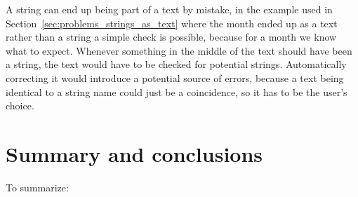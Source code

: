 A {\bibtex} string can end up being part of a text by mistake, in the
example used in Section~\ref{sec:problems_strings_as_text} where the
month ended up as a text rather than a string a simple check is
possible, because for a month we know what to expect.  Whenever
something in the middle of the text should have been a string, the
text would have to be checked for potential strings.  Automatically
correcting it would introduce a potential source of errors, because a
text being identical to a string name could just be a coincidence, so
it has to be the user's choice.



\section{Summary and conclusions}

To summarize:








